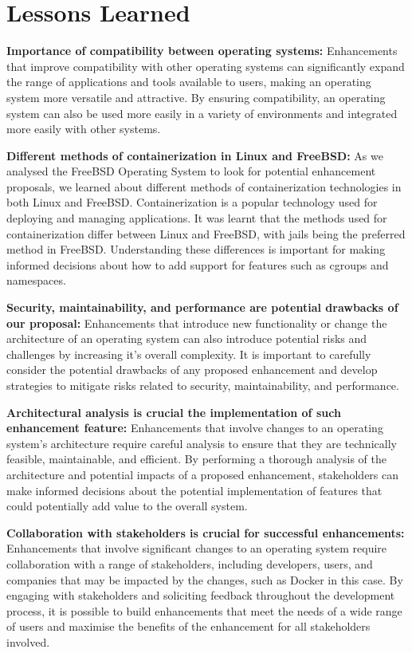 \documentclass[12pt, dvipsnames, a4paper]{article}
\begin{document}
\section{Lessons Learned}

\textbf{Importance of compatibility between operating systems:}  Enhancements that improve compatibility with other operating systems can significantly expand the range of applications and tools available to users, making an operating system more versatile and attractive. By ensuring compatibility, an operating system can also be used more easily in a variety of environments and integrated more easily with other systems.

\textbf{Different methods of containerization in Linux and FreeBSD:} As we analysed the FreeBSD Operating System to look for potential enhancement proposals, we learned about different methods of containerization technologies in both Linux and FreeBSD. Containerization is a popular technology used for deploying and managing applications. It was learnt that the methods used for containerization differ between Linux and FreeBSD, with jails being the preferred method in FreeBSD. Understanding these differences is important for making informed decisions about how to add support for features such as cgroups and namespaces.

\textbf{Security, maintainability, and performance are potential drawbacks of our proposal:} Enhancements that introduce new functionality or change the architecture of an operating system can also introduce potential risks and challenges by increasing it's overall complexity. It is important to carefully consider the potential drawbacks of any proposed enhancement and develop strategies to mitigate risks related to security, maintainability, and performance.

\textbf{Architectural analysis is crucial the implementation of such enhancement feature:} Enhancements that involve changes to an operating system's architecture require careful analysis to ensure that they are technically feasible, maintainable, and efficient. By performing a thorough analysis of the architecture and potential impacts of a proposed enhancement, stakeholders can make informed decisions about the potential implementation of features that could potentially add value to the overall system.

\textbf{Collaboration with stakeholders is crucial for successful enhancements:} Enhancements that involve significant changes to an operating system require collaboration with a range of stakeholders, including developers, users, and companies that may be impacted by the changes, such as Docker in this case. By engaging with stakeholders and soliciting feedback throughout the development process, it is possible to build enhancements that meet the needs of a wide range of users and maximise the benefits of the enhancement for all stakeholders involved.
\clearpage
\end{document}

